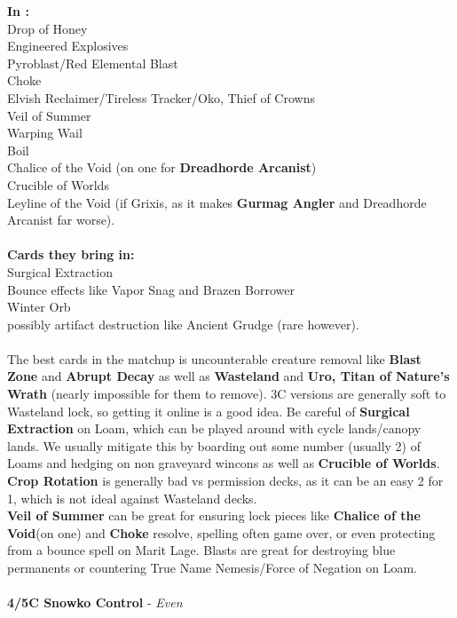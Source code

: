 \documentclass{report}
\begin{document}
\textbf{In :}\\
Drop of Honey\\Engineered Explosives\\Pyroblast/Red Elemental Blast\\Choke\\Elvish Reclaimer/Tireless Tracker/Oko, Thief of Crowns\\Veil of Summer\\Warping Wail\\Boil\\Chalice of the Void (on one for \textbf{Dreadhorde Arcanist})\\Crucible of Worlds\\Leyline of the Void (if Grixis, as it makes \textbf{Gurmag Angler} and Dreadhorde Arcanist far worse).\\\\
\textbf{Cards they bring in:}\\Surgical Extraction\\Bounce effects like Vapor Snag and Brazen Borrower\\Winter Orb\\possibly artifact destruction like Ancient Grudge (rare however).\\\\
The best cards in the matchup is uncounterable creature removal like \textbf{Blast Zone} and \textbf{Abrupt Decay} as well as \textbf{Wasteland} and \textbf{Uro, Titan of Nature's Wrath} (nearly impossible for them to remove). 3C versions are generally soft to Wasteland lock, so getting it online is a good idea. Be careful of \textbf{Surgical Extraction} on Loam, which can be played around with cycle lands/canopy lands. We usually mitigate this by boarding out some number (usually 2) of Loams and hedging on non graveyard wincons as well as \textbf{Crucible of Worlds}.\\
\textbf{Crop Rotation} is generally bad vs permission decks, as it can be an easy 2 for 1, which is not ideal against Wasteland decks.\\ \textbf{Veil of Summer} can be great for ensuring lock pieces like \textbf{Chalice of the Void}(on one) and \textbf{Choke} resolve, spelling often game over, or even protecting from a bounce spell on Marit Lage. Blasts are great for destroying blue permanents or countering True Name Nemesis/Force of Negation on Loam.\\\\
\textbf{4/5C Snowko Control} - \emph{Even}\\
\end{document}
